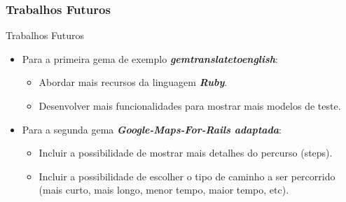 \begin{frame}
\frametitle{Trabalhos Futuros}

  \begin{block}{Trabalhos Futuros}

   \begin{itemize}

    \item Para a primeira gema de exemplo \emph{\textbf{gemtranslatetoenglish}}:

    \begin{itemize}

     \item Abordar mais recursos da linguagem \emph{\textbf{Ruby}}.

     \item Desenvolver mais funcionalidades para mostrar mais modelos de teste.

    \end{itemize}

    \item Para a segunda gema \emph{\textbf{Google-Maps-For-Rails adaptada}}:

    \begin{itemize}
     
     \item Incluir a possibilidade de mostrar mais detalhes do percurso (steps).

     \item Incluir a possibilidade de escolher o tipo de caminho a ser percorrido
     (mais curto, mais longo, menor tempo, maior tempo, etc).

    \end{itemize}


   \end{itemize}

  \end{block}

\end{frame}


